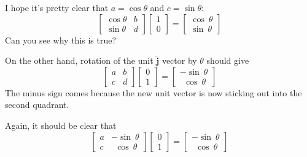 \documentclass[11pt, oneside]{article}
\begin{document}
I hope it's pretty clear that $a = \cos \theta$ and $c = \sin \theta$:
\[
\begin{bmatrix}  
\cos \theta & b  \\  
\sin \theta & d  
\end{bmatrix}
\begin{bmatrix}  
1  \\  
0  
\end{bmatrix}
=
\begin{bmatrix}  
\cos\  \theta  \\  
\sin\  \theta  
\end{bmatrix}
\]
Can you see why this is true?

On the other hand, rotation of the unit $\hat{\mathbf{j}}$ vector by $\theta$ should give
\[
\begin{bmatrix}  
a & b  \\  
c & d  
\end{bmatrix}
\begin{bmatrix}  
0  \\  
1  
\end{bmatrix}
=
\begin{bmatrix}  
-\sin \  \theta  \\  
\ \ \cos \  \theta  
\end{bmatrix}
\]
The minus sign comes because the new unit vector is now sticking out into the second quadrant.

Again, it should be clear that 
\[
\begin{bmatrix}  
a & -\sin \  \theta  \\  
c & \ \ \cos \  \theta  
\end{bmatrix}
\begin{bmatrix}  
0  \\  
1  
\end{bmatrix}
=
\begin{bmatrix}  
-\sin \  \theta  \\  
\ \ \cos \  \theta  
\end{bmatrix}
\]
\end{document}

